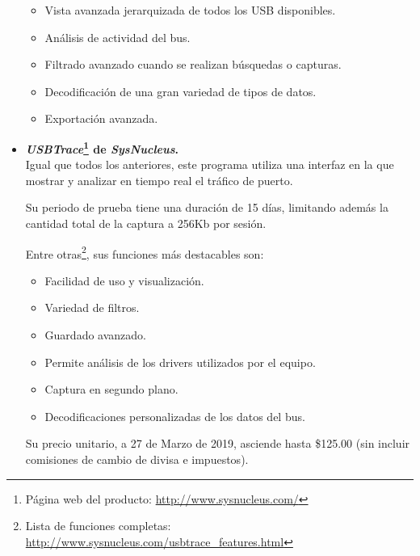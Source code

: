 \begin{itemize}
    \noWord [terminar]

    \begin{itemize}
        \item Vista avanzada jerarquizada de todos los USB disponibles.
        \item Análisis de actividad del bus.
        \item Filtrado avanzado cuando se realizan búsquedas o capturas.
        \item Decodificación de una gran variedad de tipos de datos.
        \item Exportación avanzada.
    \end{itemize}
    
    
    \item \textbf{\emph{USBTrace}\footnote{Página web del producto: \url{http://www.sysnucleus.com/}} de \emph{SysNucleus}.} \\
    Igual que todos los anteriores, este programa utiliza una interfaz en la que mostrar y analizar en tiempo real el tráfico de puerto.

    Su periodo de prueba tiene una duración de 15 días, limitando además la cantidad total de la captura a 256Kb por sesión.

    Entre otras\footnote{Lista de funciones completas: \url{http://www.sysnucleus.com/usbtrace_features.html}}, sus funciones más destacables son:
    \begin{itemize}
        \item Facilidad de uso y visualización.
        \item Variedad de filtros.
        \item Guardado avanzado.
        \item Permite análisis de los drivers utilizados por el equipo. 
        \item Captura en segundo plano.
        \item Decodificaciones personalizadas de los datos del bus.
    \end{itemize}

    Su precio unitario, a 27 de Marzo de 2019, asciende hasta \$125.00 (sin incluir comisiones de cambio de divisa e impuestos).
\end{itemize}

